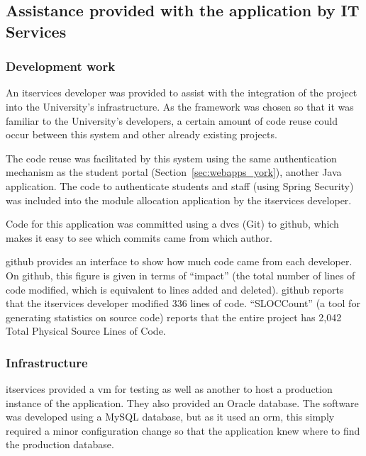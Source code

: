 
\subsection{Assistance provided with the application by IT Services}

\subsubsection{Development work}

An \gls{itservices} developer was provided to assist with the integration of
the project into the University's infrastructure. As the framework was chosen
so that it was familiar to the University's developers, a certain amount of
code reuse could occur between this system and other already existing
projects.

The code reuse was facilitated by this system using the same authentication
mechanism as the student portal (Section~\ref{sec:webapps_york}), another Java
application. The code to authenticate students and staff (using Spring
Security) was included into the module allocation application by the
\gls{itservices} developer.

Code for this application was committed using a \gls{dvcs} (Git) to \gls{github},
which makes it easy to see which commits came from which author.

\gls{github} provides an interface to show how much code came from each
developer. On \gls{github}, this figure is given in terms of ``impact'' (the
total number of lines of code modified, which is equivalent to lines added and
deleted). \gls{github} reports that the \gls{itservices} developer modified
336 lines of code. \mbox{``SLOCCount''} \cite{SLOCCount} (a tool for
generating statistics on source code) reports that the entire project has
2,042 Total Physical Source Lines of Code.

\subsubsection{Infrastructure}

\gls{itservices} provided a \gls{vm} for testing as well as another to host a
production instance of the application. They also provided an Oracle database.
The software was developed using a MySQL database, but as it used an
\gls{orm}, this simply required a minor configuration change so that the
application knew where to find the production database.

